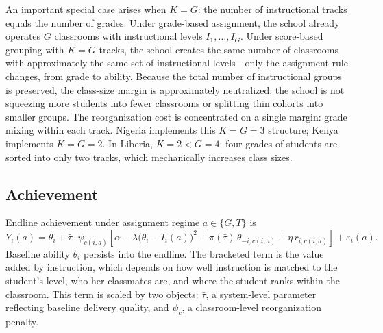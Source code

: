\documentclass[11pt]{article}
\begin{document}
An important special case arises when $K = G$: the number of instructional tracks equals the number of grades. Under grade-based assignment, the school already operates $G$ classrooms with instructional levels $I_1, \ldots, I_G$. Under score-based grouping with $K = G$ tracks, the school creates the same number of classrooms with approximately the same set of instructional levels---only the assignment rule changes, from grade to ability. Because the total number of instructional groups is preserved, the class-size margin is approximately neutralized: the school is not squeezing more students into fewer classrooms or splitting thin cohorts into smaller groups. The reorganization cost is concentrated on a single margin: grade mixing within each track. Nigeria implements this $K = G = 3$ structure; Kenya implements $K = G = 2$. In Liberia, $K = 2 < G = 4$: four grades of students are sorted into only two tracks, which mechanically increases class sizes.

\subsection{Achievement}

Endline achievement under assignment regime $a \in \{G, T\}$ is
\begin{equation}
\label{eq:learning}
Y_i(a) = \theta_i + \bar{\tau} \cdot \psi_{c(i,a)} \left[\alpha - \lambda\big(\theta_i - I_i(a)\big)^2 + \pi(\bar{\tau})\,\bar{\theta}_{-i,c(i,a)} + \eta\, r_{i,c(i,a)}\right] + \varepsilon_i(a).
\end{equation}
Baseline ability $\theta_i$ persists into the endline. The bracketed term is the value added by instruction, which depends on how well instruction is matched to the student's level, who her classmates are, and where the student ranks within the classroom. This term is scaled by two objects: $\bar{\tau}$, a system-level parameter reflecting baseline delivery quality, and $\psi_c$, a classroom-level reorganization penalty.
\end{document}
